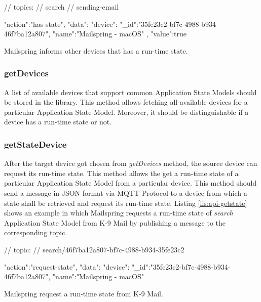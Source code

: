 \FloatBarrier
\begin{code}
\begin{js2}
// topics:
// search
// sending-email
\end{js2}

\begin{json}
{
   "action":"has-state",
   "data":{
      "device":{
         "_id":"35fe23c2-bf7c-4988-b934-46f7ba12a807",
         "name":"Mailspring - macOS"
      },
      "value":true
   }
}
\end{json}
\caption{Mailspring informs other devices that has a run-time state.}
\label{lis:api-sethasstate}
\end{code}
\FloatBarrier


\subsubsection{getDevices}
A list of available devices that support common Application State Models should be stored in the library. This method allows fetching all available devices for a particular Application State Model. Moreover, it should be distinguishable if a device has a run-time state or not.

\subsubsection{getStateDevice}
After the target device got chosen from \textit{getDevices} method, the source device can request its run-time state. This method allows the get a run-time state of a particular Application State Model from a particular device. This method should send a message in JSON format via MQTT Protocol to a device from which a state shall be retrieved and request its run-time state. Listing \ref{lis:api-getstate} shows an example in which Mailspring requests a run-time state of \textit{search} Application State Model from K-9 Mail by publishing a message to the corresponding topic.

\FloatBarrier
\begin{code}
\begin{js2}
// topic:
// search/46f7ba12a807-bf7c-4988-b934-35fe23c2
\end{js2}

\begin{json}
{
   "action":"request-state",
   "data":{
      "device":{
         "_id":"35fe23c2-bf7c-4988-b934-46f7ba12a807",
         "name":"Mailspring - macOS"
      }
   }
}
\end{json}
\caption{Mailspring request a run-time state from K-9 Mail.}
\label{lis:api-getstate}
\end{code}
\FloatBarrier

